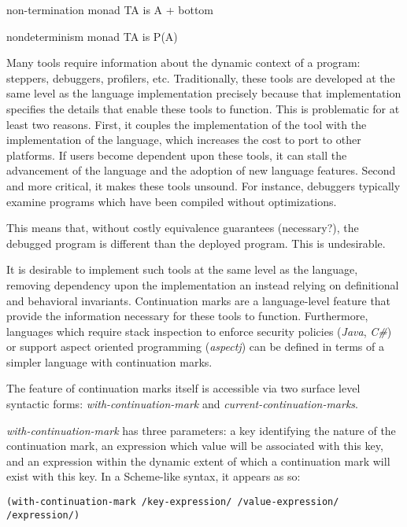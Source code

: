 \documentclass[ms]{byuprop}
\begin{document}

non-termination monad
TA is A + {bottom}

nondeterminism monad
TA is P(A)


Many tools require information about the dynamic context of a program: steppers,
debuggers, profilers, etc. Traditionally, these tools are developed at the same level as
the language implementation precisely because that implementation specifies the details
that enable these tools to function. This is problematic for at least two reasons. First,
it couples the implementation of the tool with the implementation of the language, which
increases the cost to port to other platforms. If users become dependent upon these tools,
it can stall the advancement of the language and the adoption of new language features.
Second and more critical, it makes these tools unsound. For instance, debuggers typically
examine programs which have been compiled without optimizations.


This means that, without costly equivalence guarantees (necessary?), the debugged program
is different than the deployed program. This is undesirable.

It is desirable to implement such tools at the same level as the language, removing
dependency upon the implementation an instead relying on definitional and behavioral
invariants. Continuation marks are a language-level feature that provide the information
necessary for these tools to function. Furthermore, languages which require stack
inspection to enforce security policies (\emph{Java}, \emph{C\#}) or support aspect
oriented programming (\emph{aspectj}) can be defined in terms of a simpler language with
continuation marks.

The feature of continuation marks itself is accessible via two surface level syntactic
forms: \emph{with-continuation-mark} and \emph{current-continuation-marks}.

\emph{with-continuation-mark} has three parameters: a key identifying the nature of the
continuation mark, an expression which value will be associated with this key, and an
expression within the dynamic extent of which a continuation mark will exist with this
key. In a Scheme-like syntax, it appears as so:

\begin{verbatim}
(with-continuation-mark /key-expression/ /value-expression/ /expression/)
\end{verbatim}
\end{document}
